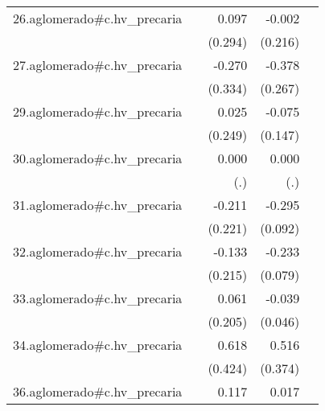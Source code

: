 {\begin{longtable}{l*{4}{D{.}{.}{-1}}}
\addlinespace
26.aglomerado#c.hv\_precaria&                     &       0.097         &      -0.002         &                     \\
            &                     &     (0.294)         &     (0.216)         &                     \\
\addlinespace
27.aglomerado#c.hv\_precaria&                     &      -0.270         &      -0.378         &                     \\
            &                     &     (0.334)         &     (0.267)         &                     \\
\addlinespace
29.aglomerado#c.hv\_precaria&                     &       0.025         &      -0.075         &                     \\
            &                     &     (0.249)         &     (0.147)         &                     \\
\addlinespace
30.aglomerado#c.hv\_precaria&                     &       0.000         &       0.000         &                     \\
            &                     &         (.)         &         (.)         &                     \\
\addlinespace
31.aglomerado#c.hv\_precaria&                     &      -0.211         &      -0.295\sym{**} &                     \\
            &                     &     (0.221)         &     (0.092)         &                     \\
\addlinespace
32.aglomerado#c.hv\_precaria&                     &      -0.133         &      -0.233\sym{**} &                     \\
            &                     &     (0.215)         &     (0.079)         &                     \\
\addlinespace
33.aglomerado#c.hv\_precaria&                     &       0.061         &      -0.039         &                     \\
            &                     &     (0.205)         &     (0.046)         &                     \\
\addlinespace
34.aglomerado#c.hv\_precaria&                     &       0.618         &       0.516         &                     \\
            &                     &     (0.424)         &     (0.374)         &                     \\
\addlinespace
36.aglomerado#c.hv\_precaria&                     &       0.117         &       0.017         &                     \\

\end{longtable}}
